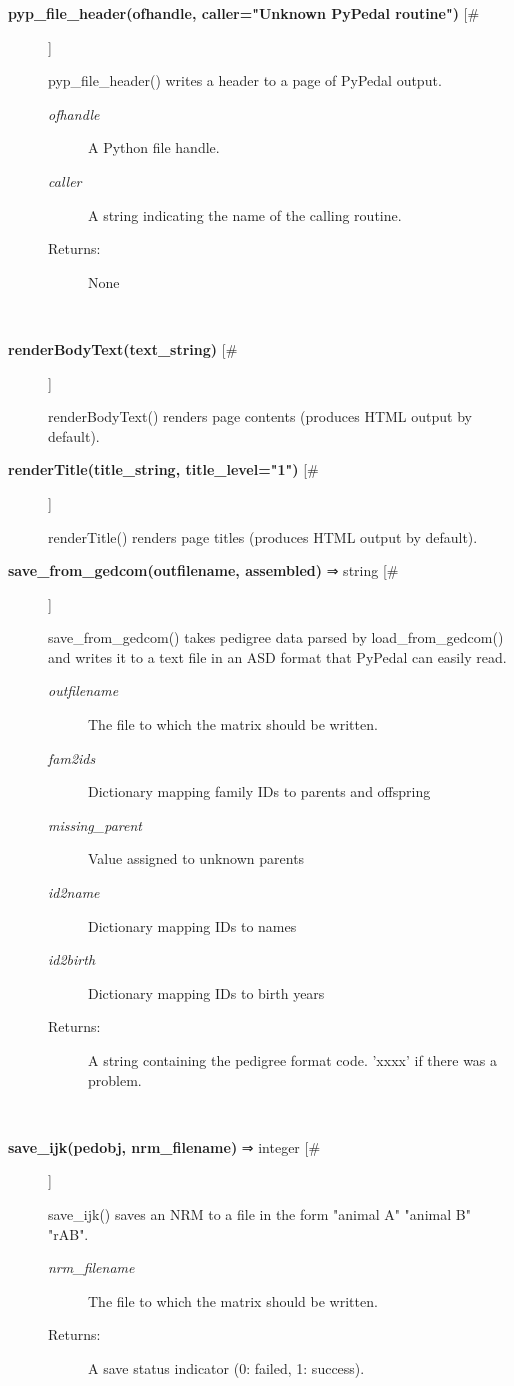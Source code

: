 \documentclass{article}
\begin{document}
\begin{description}
\item[\textbf{pyp\_file\_header(ofhandle, caller="Unknown PyPedal routine")} [\#]
]
\par pyp\_file\_header() writes a header to a page of PyPedal output.
\begin{description}
\item[\textit{ofhandle}
]
A Python file handle.
\item[\textit{caller}
]
A string indicating the name of the calling routine.
\item[Returns:
]
None
\end{description}\\

\item[\textbf{renderBodyText(text\_string)} [\#]
]
\par renderBodyText() renders page contents (produces HTML output by default).

\item[\textbf{renderTitle(title\_string, title\_level="1")} [\#]
]
\par renderTitle() renders page titles (produces HTML output by default).

\item[\textbf{save\_from\_gedcom(outfilename, assembled)} ⇒ string [\#]
]
\par save\_from\_gedcom() takes pedigree data parsed by load\_from\_gedcom() and
writes it to a text file in an ASD format that PyPedal can easily read.
\begin{description}
\item[\textit{outfilename}
]
The file to which the matrix should be written.
\item[\textit{fam2ids}
]
Dictionary mapping family IDs to parents and offspring
\item[\textit{missing\_parent}
]
Value assigned to unknown parents
\item[\textit{id2name}
]
Dictionary mapping IDs to names
\item[\textit{id2birth}
]
Dictionary mapping IDs to birth years
\item[Returns:
]
A string containing the pedigree format code. 'xxxx' if there was a problem.
\end{description}\\

\item[\textbf{save\_ijk(pedobj, nrm\_filename)} ⇒ integer [\#]
]
\par save\_ijk() saves an NRM to a file in the form "animal A" "animal B" "rAB".
\begin{description}
\item[\textit{nrm\_filename}
]
The file to which the matrix should be written.
\item[Returns:
]
A save status indicator (0: failed, 1: success).
\end{description}\\


\end{description}
\end{document}
